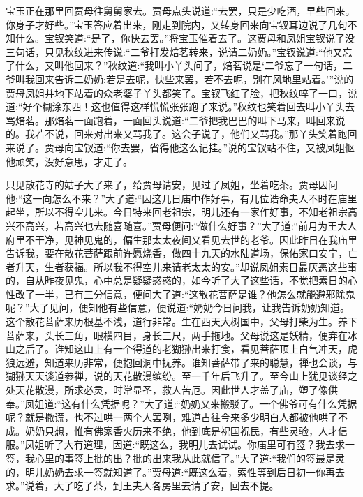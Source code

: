 \begin{parag}
    宝玉正在那里回贾母往舅舅家去。贾母点头说道:“去罢，只是少吃酒，早些回来。你身子才好些。”宝玉答应着出来，刚走到院内，又转身回来向宝钗耳边说了几句不知什么。宝钗笑道:“是了，你快去罢。”将宝玉催着去了。这贾母和凤姐宝钗说了没三句话，只见秋纹进来传说:“二爷打发焙茗转来，说请二奶奶。”宝钗说道:“他又忘了什么，又叫他回来？”秋纹道:“我叫小丫头问了，焙茗说是‘二爷忘了一句话，二爷叫我回来告诉二奶奶:若是去呢，快些来罢，若不去呢，别在风地里站着。’”说的贾母凤姐并地下站着的众老婆子丫头都笑了。宝钗飞红了脸，把秋纹啐了一口，说道:“好个糊涂东西！这也值得这样慌慌张张跑了来说。”秋纹也笑着回去叫小丫头去骂焙茗。那焙茗一面跑着，一面回头说道:“二爷把我巴巴的叫下马来，叫回来说的。我若不说，回来对出来又骂我了。这会子说了，他们又骂我。”那丫头笑着跑回来说了。贾母向宝钗道:“你去罢，省得他这么记挂。”说的宝钗站不住，又被凤姐怄他顽笑，没好意思，才走了。
\end{parag}


\begin{parag}
    只见散花寺的姑子大了来了，给贾母请安，见过了凤姐，坐着吃茶。贾母因问他:“这一向怎么不来？”大了道:“因这几日庙中作好事，有几位诰命夫人不时在庙里起坐，所以不得空儿来。今日特来回老祖宗，明儿还有一家作好事，不知老祖宗高兴不高兴，若高兴也去随喜随喜。”贾母便问:“做什么好事？”大了道:“前月为王大人府里不干净，见神见鬼的，偏生那太太夜间又看见去世的老爷。因此昨日在我庙里告诉我，要在散花菩萨跟前许愿烧香，做四十九天的水陆道场，保佑家口安宁，亡者升天，生者获福。所以我不得空儿来请老太太的安。”却说凤姐素日最厌恶这些事的，自从昨夜见鬼，心中总是疑疑惑惑的，如今听了大了这些话，不觉把素日的心性改了一半，已有三分信意，便问大了道:“这散花菩萨是谁？他怎么就能避邪除鬼呢？”大了见问，便知他有些信意，便说道:“奶奶今日问我，让我告诉奶奶知道。这个散花菩萨来历根基不浅，道行非常。生在西天大树国中，父母打柴为生。养下菩萨来，头长三角，眼横四目，身长三尺，两手拖地。父母说这是妖精，便弃在冰山之后了。谁知这山上有一个得道的老猢狲出来打食，看见菩萨顶上白气冲天，虎狼远避，知道来历非常，便抱回洞中抚养。谁知菩萨带了来的聪慧，禅也会谈，与猢狲天天谈道参禅，说的天花散漫缤纷。至一千年后飞升了。至今山上犹见谈经之处天花散漫，所求必灵，时常显圣，救人苦厄。因此世人才盖了庙，塑了像供奉。”凤姐道:“这有什么凭据呢？”大了道:“奶奶又来搬驳了。一个佛爷可有什么凭据呢？就是撒谎，也不过哄一两个人罢咧，难道古往今来多少明白人都被他哄了不成。奶奶只想，惟有佛家香火历来不绝，他到底是祝国祝民，有些灵验，人才信服。”凤姐听了大有道理，因道:“既这么，我明儿去试试。你庙里可有签？我去求一签，我心里的事签上批的出？批的出来我从此就信了。”大了道:“我们的签最是灵的，明儿奶奶去求一签就知道了。”贾母道:“既这么着，索性等到后日初一你再去求。”说着，大了吃了茶，到王夫人各房里去请了安，回去不提。
\end{parag}


